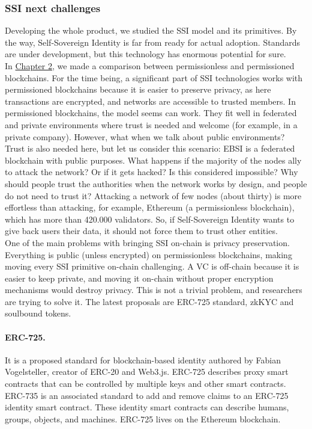 \subsubsection{SSI next challenges}
Developing the whole product, we studied the SSI model and its primitives. By the way, 
Self-Sovereign Identity is far from ready for actual adoption. Standards are under 
development, but this technology has enormous potential for sure.\\
In \hyperref[subsubsec:comparison]{Chapter 2}, we made a comparison between permissionless
and permissioned blockchains. For the time being, a significant part of SSI technologies
works with permissioned blockchains because it is easier to preserve privacy, as here 
transactions are encrypted, and networks are accessible to trusted members. In 
permissioned blockchains, the model seems can work. They fit well in federated and 
private environments where trust is needed and welcome (for example, in a private company). However, what when we talk about 
public environments? Trust is also needed here, but let us consider this scenario: EBSI 
is a federated blockchain with public purposes. What happens if the majority of the nodes 
ally to attack the network? Or if it gets hacked? Is this considered impossible? Why 
should people trust the authorities when the network works by design, and people do not need
to trust it? Attacking a network of few nodes\cite{site:ebsiterms} (about thirty\cite{site:ebsipres}) 
is more effortless than attacking, for example, Ethereum (a permissionless blockchain), which has more than 
420.000 validators\cite{site:ethstaking}. So, if Self-Sovereign Identity wants to give back users their data, 
it should not force them to trust other entities.\\
One of the main problems with bringing SSI on-chain is privacy preservation. Everything is public (unless encrypted) 
on permissionless blockchains, making moving every SSI primitive on-chain challenging. A 
VC is off-chain because it is easier to keep private, and moving it on-chain without proper 
encryption mechanisms would destroy privacy. This is not a trivial problem, and 
researchers are trying to solve it. The latest proposals are ERC-725 standard\cite{site:erc725},
zkKYC\cite{article:zkkyc} and soulbound tokens\cite{article:soulboundpaper}.

\paragraph{ERC-725.} It is a proposed standard for blockchain-based identity authored by Fabian 
Vogelsteller, creator of ERC-20 and Web3.js. ERC-725 describes proxy smart contracts that 
can be controlled by multiple keys and other smart contracts. ERC-735 is an associated 
standard to add and remove claims to an ERC-725 identity smart contract. These identity 
smart contracts can describe humans, groups, objects, and machines. ERC-725 lives on the
Ethereum blockchain.

